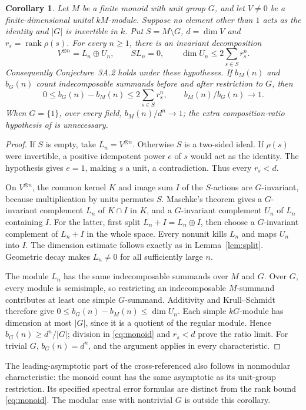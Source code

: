 \documentclass[11pt]{article}
\newtheorem{corollary}[theorem]{Corollary}
\newcommand{\rank}{\operatorname{rank}}
\begin{document}
\begin{corollary}\label{cor:monoid}
Let \(M\) be a finite monoid with unit group \(G\), and let \(V\ne0\) be a
finite-dimensional unital \(kM\)-module. Suppose no element other than \(1\)
acts as the identity and \(|G|\) is invertible in \(k\). Put \(S=M\setminus G\),
\(d=\dim V\) and \(r_s=\rank\rho(s)\). For every \(n\geq1\), there is an
invariant decomposition
\[
 V^{\otimes n}=L_n\oplus U_n,\qquad S L_n=0,
 \qquad \dim U_n\leq2\sum_{s\in S}r_s^n.
\]
Consequently Conjecture~3A.2 holds under these hypotheses. If \(b_M(n)\) and
\(b_G(n)\) count indecomposable summands before and after restriction to \(G\),
then
\begin{equation}\label{eq:monoid}
 0\leq b_G(n)-b_M(n)\leq2\sum_{s\in S}r_s^n,
 \qquad b_M(n)/b_G(n)\longrightarrow1.
\end{equation}
When \(G=\{1\}\), over every field,
\(b_M(n)/d^n\to1\); the extra composition-ratio hypothesis of
\cite[Proposition~3C.2, p.~16]{HT25} is unnecessary.
\end{corollary}
\begin{proof}
If \(S\) is empty, take \(L_n=V^{\otimes n}\). Otherwise \(S\) is a two-sided
ideal. If \(\rho(s)\) were invertible, a positive idempotent power \(e\) of
\(s\) would act as the identity. The hypothesis gives \(e=1\), making \(s\)
a unit, a contradiction. Thus every \(r_s<d\).

On \(V^{\otimes n}\), the common kernel \(K\) and image sum \(I\) of the
\(S\)-actions are \(G\)-invariant, because multiplication by units permutes
\(S\). Maschke's theorem \cite[Theorem~4.1.1(i)]{EGH} gives a \(G\)-invariant
complement \(L_n\) of \(K\cap I\) in \(K\), and a \(G\)-invariant
complement \(U_n\) of \(L_n\) containing \(I\). For the latter, first split
\(L_n+I=L_n\oplus I\), then choose a \(G\)-invariant complement of \(L_n+I\)
in the whole space. Every nonunit kills \(L_n\) and maps \(U_n\) into \(I\).
The dimension estimate follows exactly as in Lemma~\ref{lem:split}.
Geometric decay makes \(L_n\ne0\) for all sufficiently large \(n\).

The module \(L_n\) has the same indecomposable summands over \(M\) and \(G\).
Over \(G\), every module is semisimple, so restricting an indecomposable
\(M\)-summand contributes at least one simple \(G\)-summand. Additivity and
Krull--Schmidt \cite[Theorem~3.8.1]{EGH} therefore give
\(0\leq b_G(n)-b_M(n)\leq\dim U_n\).
Each simple \(kG\)-module has dimension at most \(|G|\), since it is a
quotient of the regular module. Hence \(b_G(n)\geq d^n/|G|\); division in
\eqref{eq:monoid} and \(r_s<d\) prove the ratio limit. For trivial \(G\),
\(b_G(n)=d^n\), and the argument applies in every characteristic.
\end{proof}
The leading-asymptotic part of the cross-referenced
\cite[v1, Conjecture~1B.1(1), p.~2; v2, Conjecture~1(1), p.~2]{HTgrowth}
also follows in nonmodular characteristic: the monoid count has the same
asymptotic as its unit-group restriction. Its specified spectral error formulas
are distinct from the rank bound \eqref{eq:monoid}. The modular case with
nontrivial \(G\) is outside this corollary.
\end{document}
